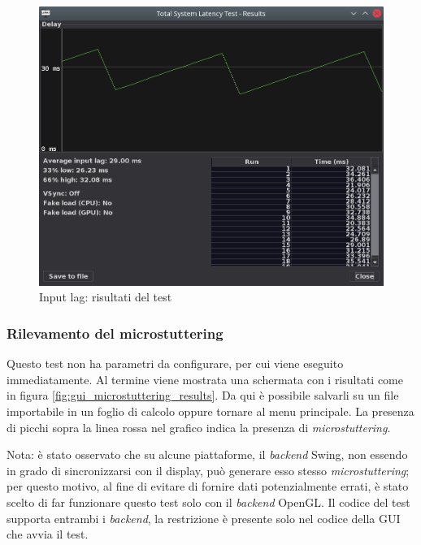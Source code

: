 \begin{figure}[H]
	\centering
	\includegraphics[width=\textwidth]{Applicazione_files/gui_inputlag_results.png}
	\caption{Input lag: risultati del test}
	\label{fig:gui_inputlag_results}
\end{figure}

\subsubsection{Rilevamento del microstuttering}
Questo test non ha parametri da configurare, per cui viene eseguito immediatamente. Al termine viene mostrata una schermata con i risultati come in figura \ref{fig:gui_microstuttering_results}. Da qui è possibile salvarli su un file importabile in un foglio di calcolo oppure tornare al menu principale. La presenza di picchi sopra la linea rossa nel grafico indica la presenza di \textit{microstuttering}.

Nota: è stato osservato che su alcune piattaforme, il \textit{backend} Swing, non essendo in grado di sincronizzarsi con il display, può generare esso stesso \textit{microstuttering}; per questo motivo, al fine di evitare di fornire dati potenzialmente errati, è stato scelto di far funzionare questo test solo con il \textit{backend} OpenGL. Il codice del test supporta entrambi i \textit{backend}, la restrizione è presente solo nel codice della GUI che avvia il test.

